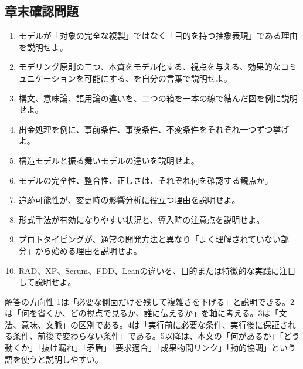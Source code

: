 \subsection{章末確認問題}
\begin{enumerate}
  \item モデルが「対象の完全な複製」ではなく「目的を持つ抽象表現」である理由を説明せよ。
  \item モデリング原則の三つ、本質をモデル化する、視点を与える、効果的なコミュニケーションを可能にする、を自分の言葉で説明せよ。
  \item 構文、意味論、語用論の違いを、二つの箱を一本の線で結んだ図を例に説明せよ。
  \item 出金処理を例に、事前条件、事後条件、不変条件をそれぞれ一つずつ挙げよ。
  \item 構造モデルと振る舞いモデルの違いを説明せよ。
  \item モデルの完全性、整合性、正しさは、それぞれ何を確認する観点か。
  \item 追跡可能性が、変更時の影響分析に役立つ理由を説明せよ。
  \item 形式手法が有効になりやすい状況と、導入時の注意点を説明せよ。
  \item プロトタイピングが、通常の開発方法と異なり「よく理解されていない部分」から始める理由を説明せよ。
  \item RAD、XP、Scrum、FDD、Leanの違いを、目的または特徴的な実践に注目して説明せよ。
\end{enumerate}

\begin{pointbox}{解答の方向性}
1は「必要な側面だけを残して複雑さを下げる」と説明できる。2は「何を省くか、どの視点で見るか、誰に伝えるか」を軸に考える。3は「文法、意味、文脈」の区別である。4は「実行前に必要な条件、実行後に保証される条件、前後で変わらない条件」である。5以降は、本文の「何があるか」「どう動くか」「抜け漏れ」「矛盾」「要求適合」「成果物間リンク」「動的協調」という語を使うと説明しやすい。
\end{pointbox}
